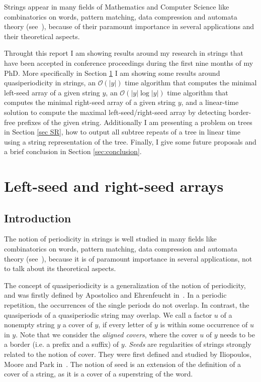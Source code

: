 \documentclass[preprint,12pt]{elsarticle}
\newcommand{\cO}{\ensuremath{\mathcal{O}}}
\begin{document}
Strings appear in many fields of Mathematics and Computer Science like
combinatorics on words, pattern matching, data compression and automata
theory (see~\cite{Lot01,Lot05}), because of their paramount importance
in several applications and their theoretical aspects.

Throught this report I am showing results around my research in strings that have been accepted in conference proceedings during the first nine months of my PhD. More specifically in Section \ref{sec LS-RS} I am showing some results around quasiperiodicity in strings, an $\cO(|y|)$ time algorithm that computes the minimal left-seed array of a given string $y$\cite{cpm_2011}, an $\cO(|y|\log |y|)$ time algorithm that computes the minimal right-seed array of a given string $y$\cite{COCOON_2011}, and a linear-time solution to compute the maximal left-seed/right-seed array by detecting border-free prefixes of the given string\cite{COCOON_2011,cpm_2011}. Additionally I am presenting a problem on trees in Section \ref{sec SR}, how to output all subtree repeats of a tree in linear time using a string representation of the tree\cite{SPIRE_2011}. Finally, I give some future proposals and a brief conclusion in Section \ref{sec:conclusion}.


\section{Left-seed and right-seed arrays}
\label{sec LS-RS}
\subsection{Introduction}

The notion of periodicity in strings is well studied in many fields like
combinatorics on words, pattern matching, data compression and automata
theory (see~\cite{Lot01,Lot05}), because it is of paramount importance
in several applications, not to talk about its theoretical aspects.

The concept of quasiperiodicity is a generalization of the notion
of periodicity, and was firstly defined by Apostolico and Ehrenfeucht in~\cite{162414}.
In a periodic repetition, the occurrences of the single periods do not overlap.
In contrast, the quasiperiods of a quasiperiodic string may overlap.
We call a factor $u$ of a nonempty string $y$ a cover of $y$, if every letter 
of $y$ is within some occurrence of $u$ in $y$. Note that we consider the \emph{aligned covers},
where the cover $u$ of $y$ needs to be a border (i.e. a prefix and a suffix) of $y$. 
\emph{Seeds} are regularities of strings strongly related to the notion of
cover. They were first defined and studied by Iliopoulos, Moore and Park in~\cite{Iliopoulos96}.
The notion of seed is an extension of the definition of a cover of a string, 
as it is a cover of a superstring of the word.
\end{document}
